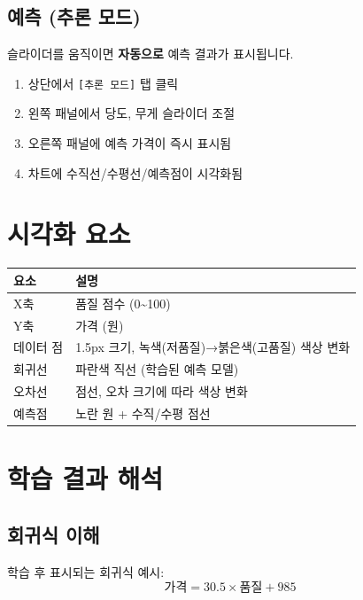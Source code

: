 \documentclass[11pt,a4paper]{article}
\begin{document}
\subsection{예측 (추론 모드)}

슬라이더를 움직이면 \textbf{자동으로} 예측 결과가 표시됩니다.

\begin{enumerate}
    \item 상단에서 \texttt{[추론 모드]} 탭 클릭
    \item 왼쪽 패널에서 당도, 무게 슬라이더 조절
    \item 오른쪽 패널에 예측 가격이 즉시 표시됨
    \item 차트에 수직선/수평선/예측점이 시각화됨
\end{enumerate}

\section{시각화 요소}

\begin{center}
\begin{tabular}{ll}
\toprule
\textbf{요소} & \textbf{설명} \\
\midrule
X축 & 품질 점수 (0\textasciitilde100) \\
Y축 & 가격 (원) \\
데이터 점 & 1.5px 크기, 녹색(저품질)→붉은색(고품질) 색상 변화 \\
회귀선 & 파란색 직선 (학습된 예측 모델) \\
오차선 & 점선, 오차 크기에 따라 색상 변화 \\
예측점 & 노란 원 + 수직/수평 점선 \\
\bottomrule
\end{tabular}
\end{center}

\section{학습 결과 해석}

\subsection{회귀식 이해}

학습 후 표시되는 회귀식 예시:
\[
\text{가격} = 30.5 \times \text{품질} + 985
\]
\end{document}
